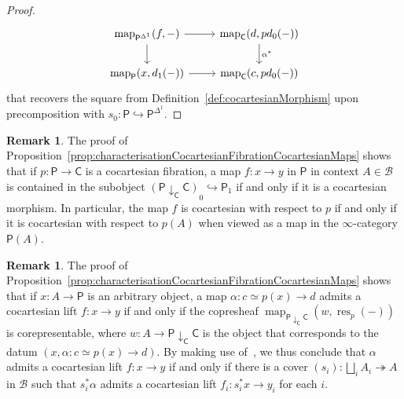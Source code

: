 \documentclass[reqno]{amsart}
\numberwithin{equation}{subsection}
\theoremstyle{plain}
\theoremstyle{definition}
\newtheorem{remark}[equation]{Remark}
\let\scr=\mathcal
\let\into=\hookrightarrow
\let\onto=\twoheadrightarrow
\def\BB{\scr B}
\DeclareMathOperator{\Map}{map}
\DeclareMathOperator{\res}{res}
\newcommand{\map}[1]{\Map_{#1}}
\newcommand{\I}[1]{\mathsf{#1}}
\newcommand{\Comma}[3]{{#1}\downarrow_{#2}{#3}}
\begin{document}
\begin{proof}
	\begin{equation*}
	\begin{tikzcd}
	\map{\I{P}^{\Delta^1}}(f,-)\arrow[r]\arrow[d] & \map{\I{C}}(d,pd_0(-))\arrow[d, "\alpha^\ast"]\\
	\map{\I{P}}(x,d_1(-))\arrow[r] & \map{\I{C}}(c,pd_0(-))
	\end{tikzcd}
	\end{equation*}
	that recovers the square from Definition~\ref{def:cocartesianMorphism} upon precomposition with $s_0\colon \I{P}\into\I{P}^{\Delta^1}$.
	\end{proof}
\begin{remark}
	\label{rem:characterisationCocartesianMorphisms}
	The proof of Proposition~\ref{prop:characterisationCocartesianFibrationCocartesianMaps} shows that if $p\colon \I{P}\to\I{C}$ is a cocartesian fibration, a map $f\colon x\to y$ in $\I{P}$ in context $A\in\BB$ is contained in the subobject $(\Comma{\I{P}}{\I{C}}{\I{C}})_0\into \I{P}_1$ if and only if it is a cocartesian morphism. In particular, the map $f$ is cocartesian with respect to $p$ if and only if it is cocartesian with respect to $p(A)$ when viewed as a map in the $\infty$-category $\I{P}(A)$.
\end{remark}

\begin{remark}
	\label{rem:CocartLiftIsLocal}
	The proof of Proposition~\ref{prop:characterisationCocartesianFibrationCocartesianMaps} shows that if $x\colon A\to\I{P}$ is an arbitrary object, a map $\alpha\colon c\simeq p(x)\to d$ admits a cocartesian lift $f\colon x\to y$ if and only if the copresheaf $\map{\Comma{\I{P}}{\I{C}}{\I{C}}}(w,\res_p(-))$ is corepresentable, where $w\colon A\to \Comma{\I{P}}{\I{C}}{\I{C}}$ is the object that corresponds to the datum $(x,\alpha\colon c\simeq p(x)\to d)$. By making use of~\cite[Remark~3.3.6]{Martini2021a}, we thus conclude that $\alpha$ admits a cocartesian lift $f\colon x\to y$ if and only if there is a cover $(s_i)\colon \bigsqcup_i A_i\onto A$ in $\BB$ such that $s_i^\ast\alpha$ admits a cocartesian lift $f_i\colon s_i^\ast x\to y_i$ for each $i$.
\end{remark}
\end{document}
